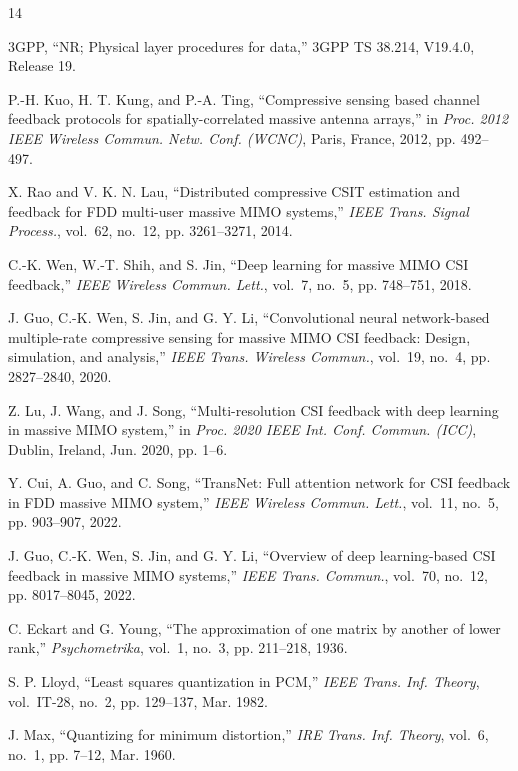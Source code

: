 \documentclass[conference]{IEEEtran}
\begin{document}

\begin{thebibliography}{14}

3GPP, ``NR; Physical layer procedures for data,'' 3GPP TS 38.214, V19.4.0, Release 19.

P.-H. Kuo, H. T. Kung, and P.-A. Ting, ``Compressive sensing based channel feedback protocols for spatially-correlated massive antenna arrays,'' in \emph{Proc. 2012 IEEE Wireless Commun. Netw. Conf. (WCNC)}, Paris, France, 2012, pp. 492--497.

X. Rao and V. K. N. Lau, ``Distributed compressive CSIT estimation and feedback for FDD multi-user massive MIMO systems,'' \emph{IEEE Trans. Signal Process.}, vol.~62, no.~12, pp. 3261--3271, 2014.

C.-K. Wen, W.-T. Shih, and S. Jin, ``Deep learning for massive MIMO CSI feedback,'' \emph{IEEE Wireless Commun. Lett.}, vol.~7, no.~5, pp. 748--751, 2018.

J. Guo, C.-K. Wen, S. Jin, and G. Y. Li, ``Convolutional neural network-based multiple-rate compressive sensing for massive MIMO CSI feedback: Design, simulation, and analysis,'' \emph{IEEE Trans. Wireless Commun.}, vol.~19, no.~4, pp. 2827--2840, 2020.

Z. Lu, J. Wang, and J. Song, ``Multi-resolution CSI feedback with deep learning in massive MIMO system,'' in \emph{Proc. 2020 IEEE Int. Conf. Commun. (ICC)}, Dublin, Ireland, Jun. 2020, pp. 1--6.

Y. Cui, A. Guo, and C. Song, ``TransNet: Full attention network for CSI feedback in FDD massive MIMO system,'' \emph{IEEE Wireless Commun. Lett.}, vol.~11, no.~5, pp. 903--907, 2022.

J. Guo, C.-K. Wen, S. Jin, and G. Y. Li, ``Overview of deep learning-based CSI feedback in massive MIMO systems,'' \emph{IEEE Trans. Commun.}, vol.~70, no.~12, pp. 8017--8045, 2022.

C. Eckart and G. Young, ``The approximation of one matrix by another of lower rank,'' \emph{Psychometrika}, vol.~1, no.~3, pp. 211--218, 1936.

S. P. Lloyd, ``Least squares quantization in PCM,'' \emph{IEEE Trans. Inf. Theory}, vol.~IT-28, no.~2, pp. 129--137, Mar. 1982.

J. Max, ``Quantizing for minimum distortion,'' \emph{IRE Trans. Inf. Theory}, vol.~6, no.~1, pp. 7--12, Mar. 1960.


\end{thebibliography}
\end{document}
